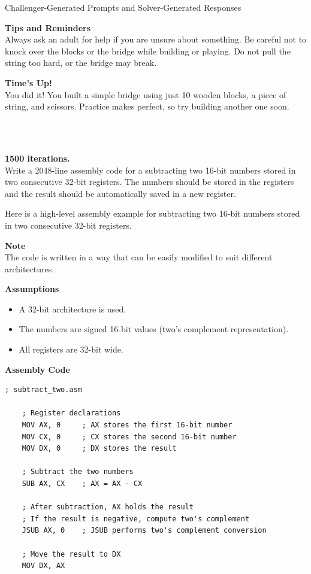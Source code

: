 \documentclass[]{fairmeta}
\newcommand{\boxfont}{\fontfamily{ppl}\selectfont} %
\begin{document}
\begin{darkbluebox}{Challenger-Generated Prompts and Solver-Generated Responses}
{{\textbf{Tips and Reminders} \\
Always ask an adult for help if you are unsure about something. Be careful not to knock over the blocks or the bridge while building or playing. Do not pull the string too hard, or the bridge may break.

\textbf{Time's Up!} \\
You did it! You built a simple bridge using just 10 wooden blocks, a piece of string, and scissors. Practice makes perfect, so try building another one soon.
}
    \\
    \\

\newpage
{\color{RoyalBlue}\boxfont\textbf{1500 iterations.} \\
{\color{BurntOrange}Write a 2048-line assembly code for a subtracting two 16-bit numbers stored in two consecutive 32-bit registers. The numbers should be stored in the registers and the result should be automatically saved in a new register.} 

Here is a high-level assembly example for subtracting two 16-bit numbers stored in two consecutive 32-bit registers.

\textbf{Note} \\
The code is written in a way that can be easily modified to suit different architectures.

\textbf{Assumptions}
\begin{itemize}\setlength\itemsep{0pt}
\item A 32-bit architecture is used.
\item The numbers are signed 16-bit values (two's complement representation).
\item All registers are 32-bit wide.
\end{itemize}

\textbf{Assembly Code}

\begin{verbatim}
; subtract_two.asm

    ; Register declarations
    MOV AX, 0     ; AX stores the first 16-bit number
    MOV CX, 0     ; CX stores the second 16-bit number
    MOV DX, 0     ; DX stores the result

    ; Subtract the two numbers
    SUB AX, CX    ; AX = AX - CX

    ; After subtraction, AX holds the result
    ; If the result is negative, compute two's complement
    JSUB AX, 0    ; JSUB performs two's complement conversion

    ; Move the result to DX
    MOV DX, AX


\end{verbatim}}}
\end{darkbluebox}
\end{document}
